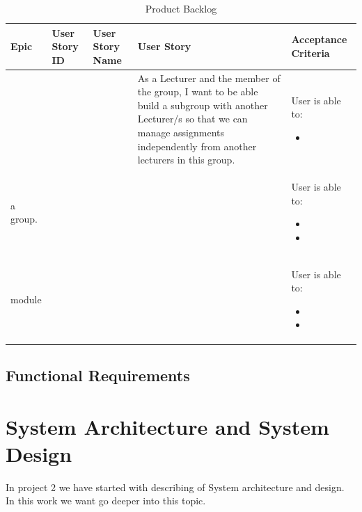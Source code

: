 \documentclass{scrartcl}
\begin{document}
\pagebreak

\begin{table}[H]
\begin{center}
\begin{tabular}{|p{4cm}|p{0.5cm} |p{3cm}|p{4cm}|p{4cm}|}\hline
\rowcolor{LightCyan}
 \textbf{Epic} &\textbf{ User Story ID} &\textbf{User Story Name} &\textbf{User Story}  & \textbf{Acceptance Criteria}  \\
\hline
&
&
&
 As a Lecturer and the member of the group, I want to be able build a subgroup with another Lecturer/s so that we can manage assignments independently from another lecturers in this group. &
 
   User is able to:            
\begin{itemize}
\item

\end{itemize}                                                                 \\ \hline

 a group. &
 &
&
&
   User is able to:            
\begin{itemize}
\item
\item


\end{itemize}                                                                 \\ \hline


 
  module &
 &
&
&
   User is able to:            
\begin{itemize}
\item
\item


\end{itemize}                                                                 \\ \hline

 \end{tabular}
\end{center}
\caption{Product Backlog}
\label{table2}
\end{table}



 
\subsection{Functional Requirements}


\section{System Architecture and System Design}
In project 2 we have started with describing of System architecture and design. In this work we want go deeper into this topic. \\
\end{document}
